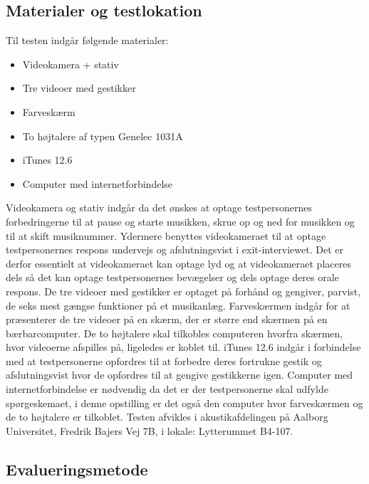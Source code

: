 \subsection{Materialer og testlokation}
\label{MaterialeOgTestlokationValgAfGestikker}
%
Til testen indgår følgende materialer:
%
\begin{itemize}
  \item Videokamera + stativ
  \item Tre videoer med gestikker
  \item Farveskærm 
  \item To højtalere af typen Genelec 1031A
  \item iTunes 12.6  
  \item Computer med internetforbindelse\blankline
\end{itemize}
% 
Videokamera og stativ indgår da det ønskes at optage testpersonernes forbedringerne til at pause og starte musikken, skrue op og ned for musikken og til at skift musiknummer. Ydermere benyttes videokameraet til at optage testpersonernes respons undervejs og afslutningsvist i exit-interviewet. Det er derfor essentielt at videokameraet kan optage lyd og at videokameraet placeres dels så det kan optage testpersonernes bevægelser og dels optage deres orale respons. De tre videoer med gestikker er optaget på forhånd og gengiver, parvist, de seks mest gængse funktioner på et musikanlæg. Farveskærmen indgår for at præsenterer de tre videoer på en skærm, der er større end skærmen på en bærbarcomputer. De to højtalere skal tilkobles computeren hvorfra skærmen, hvor videoerne afspilles på, ligeledes er koblet til. iTunes 12.6 indgår i forbindelse med at testpersonerne opfordres til at forbedre deres fortrukne gestik og afslutningsvist hvor de opfordres til at gengive gestikkerne igen. Computer med internetforbindelse er nødvendig da det er der testpersonerne skal udfylde spørgeskemaet, i denne opstilling er det også den computer hvor farveskærmen og de to højtalere er tilkoblet.\blankline
% 
Testen afvikles i akustikafdelingen på Aalborg Universitet, Fredrik Bajers Vej 7B, i lokale: Lytterummet B4-107. 
%
\subsection{Evalueringsmetode}
\label{EvalueringsmetodeValgAfGestikker}
